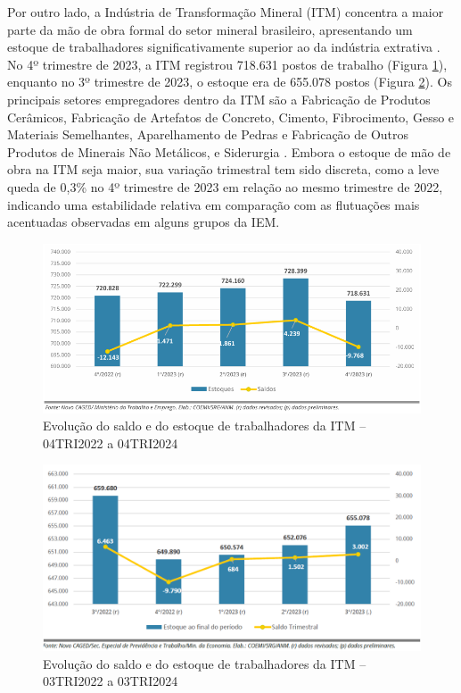 Por outro lado, a Indústria de Transformação Mineral (ITM) concentra a maior parte da mão de obra formal do setor mineral brasileiro, apresentando um estoque de trabalhadores significativamente superior ao da indústria extrativa \cite{anm2023c,anm2023d}. No 4º trimestre de 2023, a ITM registrou 718.631 postos de trabalho (Figura \ref{fig:evolucao_saldo_itm}), enquanto no 3º trimestre de 2023, o estoque era de 655.078 postos (Figura \ref{fig:evolucao_saldo_itm_3tri}). Os principais setores empregadores dentro da ITM são a Fabricação de Produtos Cerâmicos, Fabricação de Artefatos de Concreto, Cimento, Fibrocimento, Gesso e Materiais Semelhantes, Aparelhamento de Pedras e Fabricação de Outros Produtos de Minerais Não Metálicos, e Siderurgia \cite{anm2023c,anm2023d}. Embora o estoque de mão de obra na ITM seja maior, sua variação trimestral tem sido discreta, como a leve queda de 0,3\% no 4º trimestre de 2023 em relação ao mesmo trimestre de 2022, indicando uma estabilidade relativa em comparação com as flutuações mais acentuadas observadas em alguns grupos da IEM.

\begin{figure}[!htb]
    \centering
    \includegraphics[width=\textwidth]{figures/image10_evolucao_saldo_itm.png}
    \caption{Evolução do saldo e do estoque de trabalhadores da ITM -- 04TRI2022 a 04TRI2024}
    \label{fig:evolucao_saldo_itm}
\end{figure}

\begin{figure}[!htb]
    \centering
    \includegraphics[width=\textwidth]{figures/image10_evolucao_saldo_itm_3tri.png}
    \caption{Evolução do saldo e do estoque de trabalhadores da ITM -- 03TRI2022 a 03TRI2024}
    \label{fig:evolucao_saldo_itm_3tri}
\end{figure}

